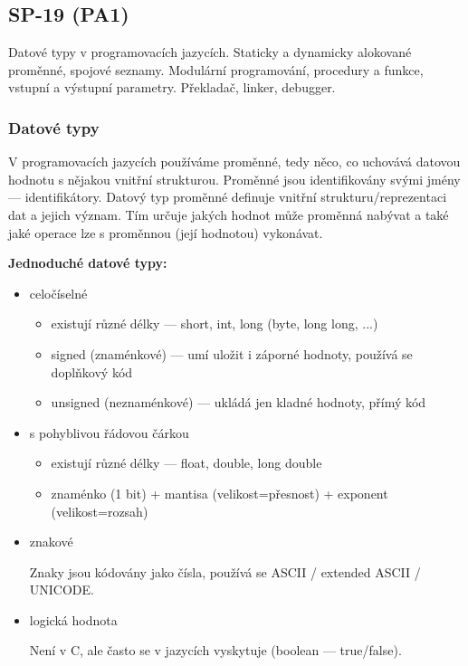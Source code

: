 \subsection{SP-19 (PA1)}
Datové typy v programovacích jazycích. Staticky a dynamicky alokované proměnné, spojové seznamy. Modulární programování, procedury a funkce, vstupní a výstupní parametry. Překladač, linker, debugger.

\subsubsection*{Datové typy}
V programovacích jazycích používáme proměnné, tedy něco, co uchovává datovou hodnotu s nějakou vnitřní strukturou. Proměnné jsou identifikovány svými jmény --- identifikátory.
Datový typ proměnné definuje vnitřní strukturu/reprezentaci dat a jejich význam. Tím určuje jakých hodnot může proměnná nabývat a také jaké operace lze s proměnnou (její hodnotou) vykonávat.

\textbf{Jednoduché datové typy:}
\begin{itemize}

	\item celočíselné
	
	\begin{itemize}
		\item existují různé délky --- short, int, long (byte, long long, ...)
		\item signed (znaménkové) --- umí uložit i záporné hodnoty, používá se doplňkový kód
		\item unsigned (neznaménkové) --- ukládá jen kladné hodnoty, přímý kód
	\end{itemize}
	
	\item s pohyblivou řádovou čárkou
	
	\begin{itemize}
		\item existují různé délky --- float, double, long double
		\item znaménko (1 bit) + mantisa (velikost=přesnost) + exponent (velikost=rozsah)
	\end{itemize}
	
	\item znakové
	
		Znaky jsou kódovány jako čísla, používá se ASCII / extended ASCII / UNICODE.
		
	\item logická hodnota
	
		Není v C, ale často se v jazycích vyskytuje (boolean --- true/false).
		
\end{itemize}

